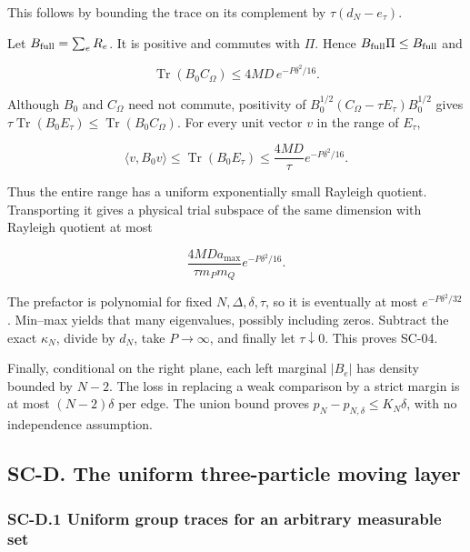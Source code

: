 \documentclass[a4paper,11pt]{article}
\numberwithin{equation}{section}
\begin{document}
This follows by bounding the trace on its complement by \(\tau(d_N-e_\tau)\).

Let \(B_{\rm full}=\sum_eR_e\). It is positive and commutes with \(\Pi\). Hence \(B_{\rm full}\Pi\leq B_{\rm full}\) and

\[
\operatorname{Tr}(B_0C_\Omega)\leq4MD\,e^{-P\delta^2/16}.
\]

Although \(B_0\) and \(C_\Omega\) need not commute, positivity of \(B_0^{1/2}(C_\Omega-\tau E_\tau)B_0^{1/2}\) gives \(\tau\operatorname{Tr}(B_0E_\tau)\leq\operatorname{Tr}(B_0C_\Omega)\). For every unit vector \(v\) in the range of \(E_\tau\),

\[
\langle v,B_0v\rangle
\leq\operatorname{Tr}(B_0E_\tau)
\leq\frac{4MD}{\tau}e^{-P\delta^2/16}.
\]

Thus the entire range has a uniform exponentially small Rayleigh quotient. Transporting it gives a physical trial subspace of the same dimension with Rayleigh quotient at most

\[
\frac{4MDa_{\max}}{\tau m_Pm_Q}e^{-P\delta^2/16}.
\]

The prefactor is polynomial for fixed \(N,\Delta,\delta,\tau\), so it is eventually at most \(e^{-P\delta^2/32}\). Min--max yields that many eigenvalues, possibly including zeros. Subtract the exact \(\kappa_N\), divide by \(d_N\), take \(P\to\infty\), and finally let \(\tau\downarrow0\). This proves SC-04.

Finally, conditional on the right plane, each left marginal \(|B_e|\) has density bounded by \(N-2\). The loss in replacing a weak comparison by a strict margin is at most \((N-2)\delta\) per edge. The union bound proves \(p_N-p_{N,\delta}\leq K_N\delta\), with no independence assumption.

\hypertarget{sc-d.-the-uniform-three-particle-moving-layer}{%
\subsection{SC-D. The uniform three-particle moving layer}\label{sc-d.-the-uniform-three-particle-moving-layer}}

\hypertarget{sc-d.1-uniform-group-traces-for-an-arbitrary-measurable-set}{%
\subsubsection{SC-D.1 Uniform group traces for an arbitrary measurable set}\label{sc-d.1-uniform-group-traces-for-an-arbitrary-measurable-set}}
\end{document}
